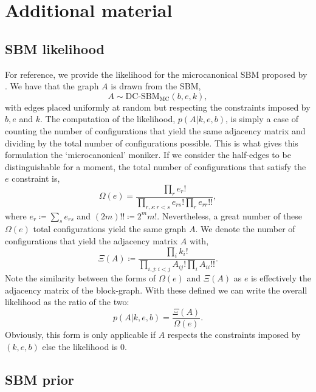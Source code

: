 \section{Additional material}

\subsection{SBM likelihood}
\label{appdx:sbm-likelihood}

For reference, we provide the likelihood for the microcanonical SBM proposed by \citet{Peixoto-Bayesian-Microcanonical}. We have that the graph $A$ is drawn from the SBM,
%
\begin{equation}
	A \sim \textrm{DC-SBM}_{\textrm{MC}}(b, e, k),
\end{equation}
%
with edges placed uniformly at random but respecting the constraints imposed by $b, e$ and $k$. The computation of the likelihood, $p(A|k, e, b)$, is simply a case of counting the number of configurations that yield the same adjacency matrix and dividing by the total number of configurations possible. This is what gives this formulation the `microcanonical' moniker. If we consider the half-edges to be distinguishable for a moment, the total number of configurations that satisfy the $e$ constraint is,
%
\begin{equation}
	\Omega(e) = \frac{\prod_{r} e_r !}{\prod_{r,s : r < s} e_{rs}! \prod_{r} e_{rr}!!},
\end{equation}
%
where $e_r \coloneqq \sum_{s} e_{rs}$ and $(2m)!! \coloneqq 2^m m!$. Nevertheless, a great number of these $\Omega(e)$ total configurations yield the same graph $A$. We denote the number of configurations that yield the adjacency matrix $A$ with,
%
\begin{equation}
	\Xi(A) \coloneqq \frac{\prod_i k_i !}{\prod_{i,j : i < j} A_{ij} ! \prod_i A_{ii} !! }.
\end{equation}
%
Note the similarity between the forms of $\Omega(e)$ and $\Xi(A)$ as $e$ is effectively the adjacency matrix of the block-graph. With these defined we can write the overall likelihood as the ratio of the two:
%
\begin{equation}
	p(A|k,e,b) = \frac{\Xi(A)}{\Omega(e)}.
\end{equation}
%
Obviously, this form is only applicable if $A$ respects the constraints imposed by $(k,e,b)$ else the likelihood is 0.

\subsection{SBM prior}
\label{appdx:sbm-prior}

